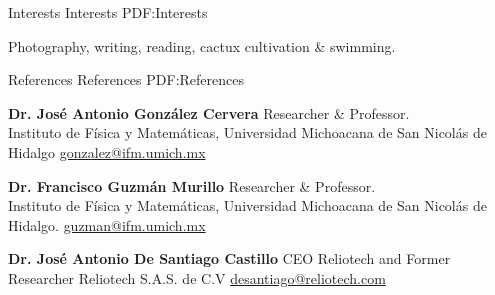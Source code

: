 \documentclass[letterpaper,MMMyyyy,nonstopmode]{simpleresumecv}
\begin{document}
\begin{Body}

\Section
{Interests}
{Interests}
{PDF:Interests}

\Entry
\BulletItem
Photography,
writing,
reading,
cactux cultivation \&
swimming.


\newpage
\BigGap

\Section
{References}
{References}
{PDF:References}

\BulletItem
\textbf{Dr. Jos\'e Antonio Gonz\'alez Cervera}
\newline
Researcher \& Professor. \\
Instituto de F\'isica y Matem\'aticas,
\newline
Universidad Michoacana de San Nicol\'as de Hidalgo
\newline
\href{mailto:gonzalez@ifm.umich.mx}
{gonzalez@ifm.umich.mx}

\BigGap
\BigGap

\BulletItem
\textbf{Dr. Francisco Guzm\'an Murillo}
\newline
Researcher \& Professor. \\
Instituto de F\'isica y Matem\'aticas, \newline
Universidad Michoacana de San Nicol\'as de Hidalgo.
\newline
\href{mailto:guzman@ifm.umich.mx}
{guzman@ifm.umich.mx}


\BigGap
\BigGap

\BulletItem
\textbf{Dr. Jos\'e Antonio De Santiago Castillo}
\newline
CEO Reliotech and Former Researcher
\newline
Reliotech S.A.S. de C.V
\newline
\href{mailto:desantiago@reliotech.com}
{desantiago@reliotech.com}


\begin{comment}
\newpage


\begingroup
\color{red}

\Section
{This is a\newline
Section\newline
With\newline
Usage Notes}
{This is a Section With Usage Notes (For PDF Bookmark)}
{PDF:ThisIsASectionWithUsageNotes:ForPDFLink}


\end{comment}
\end{Body}
\end{document}
